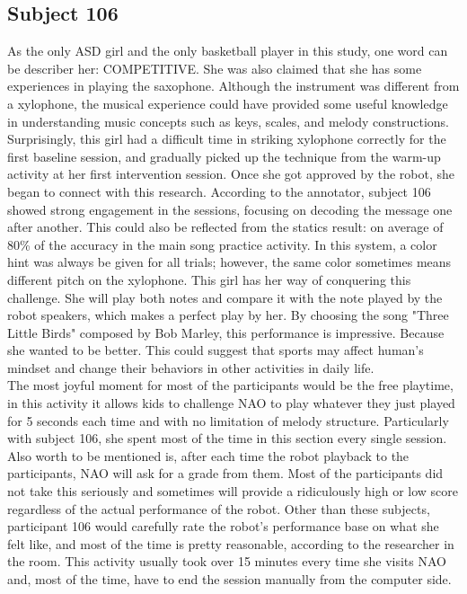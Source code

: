 \subsection{Subject 106}
As the only ASD girl and the only basketball player in this study, one word can be describer her: 
COMPETITIVE. She was also claimed that she has some experiences in playing the saxophone. Although the instrument 
was different from a xylophone, the musical experience could have provided some useful knowledge in 
understanding music concepts such as keys, scales, and melody constructions. Surprisingly, this 
girl had a difficult time in striking xylophone correctly for the first baseline session, and gradually
picked up the technique from the warm-up activity at her first intervention session. Once she got approved
by the robot, she began to connect with this research. According to the annotator, subject 106 showed
strong engagement in the sessions, focusing on decoding the message one after another. This could also 
be reflected from the statics result: on average of 80\% of the accuracy in the main song practice activity.
In this system, a color hint was always be given for all trials; however, the same color sometimes means different
pitch on the xylophone. This girl has her way of conquering this challenge. She will play both notes and
compare it with the note played by the robot speakers, which makes a perfect play by her.
By choosing the song "Three Little Birds" composed by Bob Marley, this performance is impressive. 
Because she wanted to be better. This could suggest that sports may affect human's mindset and change their
behaviors in other activities in daily life.\\

The most joyful moment for most of the participants would be the free playtime, in this activity it allows
kids to challenge NAO to play whatever they just played for 5 seconds each time and with no limitation of
melody structure. Particularly with subject 106, she spent most of the time in this section every single session.
Also worth to be mentioned is, after each time the robot playback to the participants, NAO will ask for a 
grade from them. Most of the participants did not take this seriously and sometimes will provide a ridiculously
high or low score regardless of the actual performance of the robot. Other than these subjects, participant
106 would carefully rate the robot's performance base on what she felt like, and most of the time is pretty
reasonable, according to the researcher in the room. This activity usually took over 15 minutes every time she 
visits NAO and, most of the time, have to end the session manually from the computer side. \\

